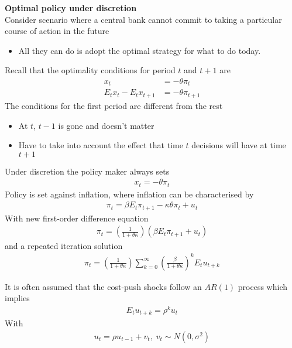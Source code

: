 \documentclass{beamer}
\begin{document}
\begin{frame}
  \textbf{Optimal policy under discretion}\\  
  Consider scenario where a central bank cannot commit to taking a particular course of action in the future
  \begin{itemize}
    \item All they can do is adopt the optimal strategy for what to do today.  
  \end{itemize}
Recall that the optimality conditions for period $t$ and $t+1$ are
\begin{align}
  x_t &= -\theta\pi_t\\
  E_tx_t - E_tx_{t+1} &= -\theta\pi_{t+1}
\end{align}
The conditions for the first period are different from the rest
\begin{itemize}
   \item At $t$, $t-1$ is gone and doesn't matter
   \item Have to take into account the effect that time $t$ decisions will have at time $t+1$
 \end{itemize} 
\end{frame}

\begin{frame}
 Under discretion the policy maker always sets 
\begin{align}
  x_t=-\theta\pi_t
\end{align}
Policy is set against inflation, where inflation can be characterised by 
\begin{align}
  \pi_t=\beta E_t\pi_{t+1}-\kappa\theta\pi_t+u_t
\end{align}
With new first-order difference equation
\begin{align}
  \pi_t=\left(\frac{1}{1+\theta\kappa}\right) (\beta E_t\pi_{t+1} + u_t)
\end{align}
and a repeated iteration solution
\begin{align}
  \pi_t = \left(\frac{1}{1+\theta\kappa}\right) \sum_{k=0}^{\infty} \left(\frac{\beta}{1+\theta\kappa}\right)^k E_tu_{t+k}
\end{align}
\end{frame}

\begin{frame}
  It is often assumed that the cost-push shocks follow an $AR(1)$ process which implies 
  \begin{align}
    E_tu_{t+k}=\rho^ku_t
  \end{align}
  With 
  \begin{align}
 u_t=\rho u_{t-1} + v_t,\; v_t \sim N(0,\sigma^2) 
\end{align}
\end{frame}
\end{document}
